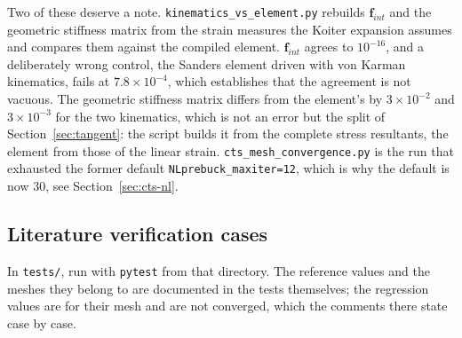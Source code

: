 \documentclass[11pt,a4paper]{article}
\begin{document}
\noindent
Two of these deserve a note.
\texttt{kinematics\_vs\_element.py} rebuilds $\boldsymbol{f}_{int}$ and the
geometric stiffness matrix from the strain measures the Koiter expansion
assumes and compares them against the compiled element.
$\boldsymbol{f}_{int}$ agrees to $10^{-16}$, and a deliberately wrong control,
the Sanders element driven with von Karman kinematics, fails at
$7.8\times10^{-4}$, which establishes that the agreement is not vacuous.  The
geometric stiffness matrix differs from the element's by $3\times10^{-2}$ and
$3\times10^{-3}$ for the two kinematics, which is not an error but the split
of Section~\ref{sec:tangent}: the script builds it from the complete stress
resultants, the element from those of the linear strain.
\texttt{cts\_mesh\_convergence.py} is the run that exhausted the former
default \texttt{NLprebuck\_maxiter=12}, which is why the default is now $30$,
see Section~\ref{sec:cts-nl}.

\subsection{Literature verification cases}
\label{sec:appendix-tests}

In \texttt{tests/}, run with \texttt{pytest} from that directory.  The
reference values and the meshes they belong to are documented in the tests
themselves; the regression values are for their mesh and are not converged,
which the comments there state case by case.
\end{document}
